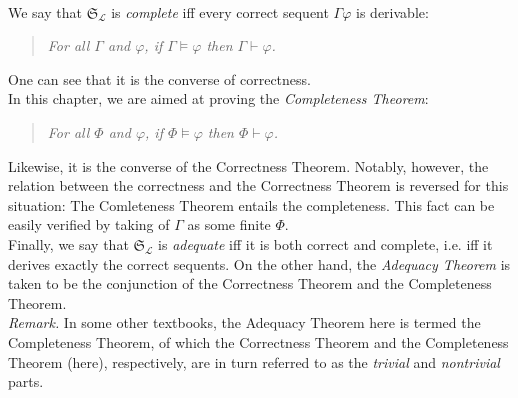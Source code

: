 \begin{enumerate}[1.]
\ 
\\We say that $\mathfrak{S}_\mathcal{L}$ is \emph{complete} iff every correct sequent $\Gamma\varphi$ is derivable:
\begin{quote}
\emph{For all $\Gamma$ and $\varphi$, if $\Gamma \models \varphi$ then $\Gamma \vdash \varphi$.}
\end{quote}
One can see that it is the converse of correctness.\newline
\ 
\\In this chapter, we are aimed at proving the \emph{Completeness Theorem}:
\begin{quote}
\emph{For all $\Phi$ and $\varphi$, if $\Phi \models \varphi$ then $\Phi \vdash \varphi$.}
\end{quote}
Likewise, it is the converse of the Correctness Theorem. Notably, however, the relation between the correctness and the Correctness Theorem is reversed for this situation: The Comleteness Theorem entails the completeness. This fact can be easily verified by taking of $\Gamma$ as some finite $\Phi$.\newline
\ 
\\Finally, we say that $\mathfrak{S}_\mathcal{L}$ is \emph{adequate} iff it is both correct and complete, i.e. iff it derives exactly the correct sequents. On the other hand, the \emph{Adequacy Theorem} is taken to be the conjunction of the Correctness Theorem and the Completeness Theorem.\newline
\ 
\\
\textit{Remark.} In some other textbooks, the Adequacy Theorem here is termed the Completeness Theorem, of which the Correctness Theorem and the Completeness Theorem (here), respectively, are in turn referred to as the \emph{trivial} and \emph{nontrivial} parts.
\end{enumerate}
